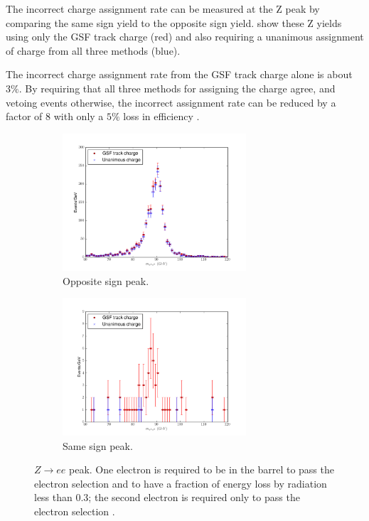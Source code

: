 The incorrect charge assignment rate can be measured at the Z peak by comparing
the same sign \HepProcess{\PZ\to\Pepm\Pepm} yield to the opposite sign
\HepProcess{\PZ\to\Pelectron\APelectron} yield.  show these
Z yields using only the {GSF} track charge (red) and also requiring a unanimous
assignment of charge from all three methods (blue). 

The incorrect charge assignment rate from the GSF track charge alone is about
$3\%$.  By requiring that all three methods for assigning the charge agree, and
vetoing events otherwise, the incorrect assignment rate can be reduced by a
factor of 8 with only a $5\%$ loss in efficiency \cite{baisini2010electron}.

\begin{figure}[htbp]
  \centering
  \begin{subfigure}{\textwidth}
    \centering
    \includegraphics[width=0.75\textwidth]{zpeak_os}
    \caption{Opposite sign \PZ peak.}
    \label{fig:zpeak_os}
  \end{subfigure}
  \begin{subfigure}{\textwidth}
    \centering
    \includegraphics[width=0.75\textwidth]{zpeak_ss}
    \caption{Same sign \PZ peak.}
    \label{fig:zpeak_ss}
  \end{subfigure}
  \caption[$Z\rightarrow ee$ peak.]
{ $Z\rightarrow ee$ peak. One electron is required to be in the
barrel to pass the electron selection and to have a fraction of energy loss by
radiation less than 0.3; the second electron is required only to pass the
electron selection \cite{baisini2010electron}.}\label{fig:zpeak} 
\end{figure}

